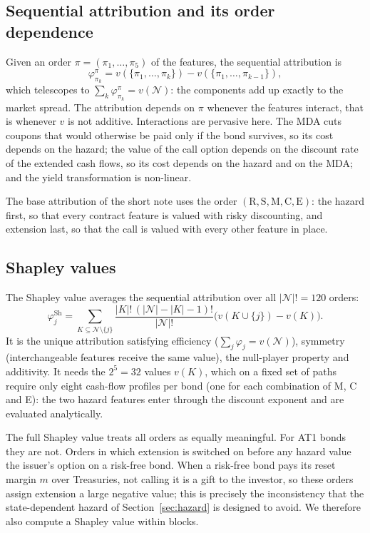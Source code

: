 \subsection{Sequential attribution and its order dependence}

Given an order $\pi=(\pi_1,\dots,\pi_5)$ of the features, the sequential attribution is
\begin{equation}\label{eq:sequential}
  \varphi^\pi_{\pi_k}=v(\{\pi_1,\dots,\pi_k\})-v(\{\pi_1,\dots,\pi_{k-1}\}),
\end{equation}
which telescopes to $\sum_k\varphi^\pi_{\pi_k}=v(\mathcal N)$: the components add up
exactly to the market spread. The attribution depends on $\pi$ whenever the features
interact, that is whenever $v$ is not additive. Interactions are pervasive here. The MDA
cuts coupons that would otherwise be paid only if the bond survives, so its cost depends on
the hazard; the value of the call option depends on the discount rate of the extended
cash flows, so its cost depends on the hazard and on the MDA; and the yield transformation
is non-linear.

The base attribution of the short note uses the order $(\mathrm R,\mathrm S,\mathrm M,\mathrm C,\mathrm E)$:
the hazard first, so that every contract feature is valued with risky discounting, and
extension last, so that the call is valued with every other feature in place.

\subsection{Shapley values}

The Shapley value \citep{Shapley1953} averages the sequential attribution over all
$|\mathcal N|!=120$ orders:
\begin{equation}\label{eq:shapley}
  \varphi^{\mathrm{Sh}}_j=\sum_{K\subseteq\mathcal N\setminus\{j\}}
  \frac{|K|!\,(|\mathcal N|-|K|-1)!}{|\mathcal N|!}\bigl(v(K\cup\{j\})-v(K)\bigr).
\end{equation}
It is the unique attribution satisfying efficiency ($\sum_j\varphi_j=v(\mathcal N)$),
symmetry (interchangeable features receive the same value), the null-player property
and additivity. It needs the $2^5=32$ values $v(K)$, which on a fixed set of paths require
only eight cash-flow profiles per bond (one for each combination of M, C and E): the two
hazard features enter through the discount exponent and are evaluated analytically.

The full Shapley value treats all orders as equally meaningful. For AT1 bonds they are
not. Orders in which extension is switched on before any hazard value the issuer's option
on a risk-free bond. When a risk-free bond pays its reset margin $m$ over Treasuries, not
calling it is a gift to the investor, so these orders assign extension a large negative
value; this is precisely the inconsistency that the state-dependent hazard of
Section~\ref{sec:hazard} is designed to avoid. We therefore also compute a Shapley value
within blocks.

